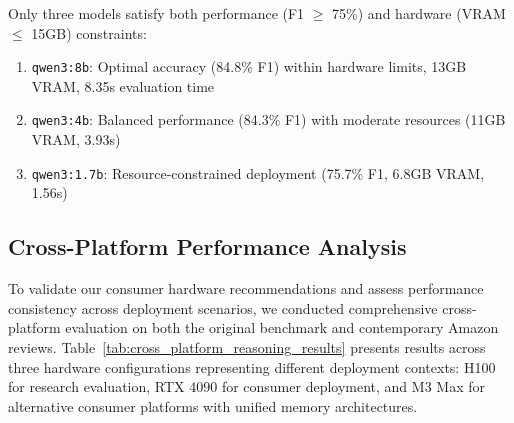 \documentclass[conference]{IEEEtran}
\newcommand{\qwenthree}[1]{\texttt{qwen3:#1}}
\begin{document}
Only three models satisfy both performance (F1 $\geq$ 75\%) and hardware (VRAM $\leq$ 15GB) constraints:

\begin{enumerate}[leftmargin=*,nosep]
\item \qwenthree{8b}: Optimal accuracy (84.8\% F1) within hardware limits, 13GB VRAM, 8.35s evaluation time
\item \qwenthree{4b}: Balanced performance (84.3\% F1) with moderate resources (11GB VRAM, 3.93s)  
\item \qwenthree{1.7b}: Resource-constrained deployment (75.7\% F1, 6.8GB VRAM, 1.56s)
\end{enumerate}

\subsection{Cross-Platform Performance Analysis}

To validate our consumer hardware recommendations and assess performance consistency across deployment scenarios, we conducted comprehensive cross-platform evaluation on both the original benchmark and contemporary Amazon reviews. Table~\ref{tab:cross_platform_reasoning_results} presents results across three hardware configurations representing different deployment contexts: H100 for research evaluation, RTX 4090 for consumer deployment, and M3 Max for alternative consumer platforms with unified memory architectures.
\end{document}
